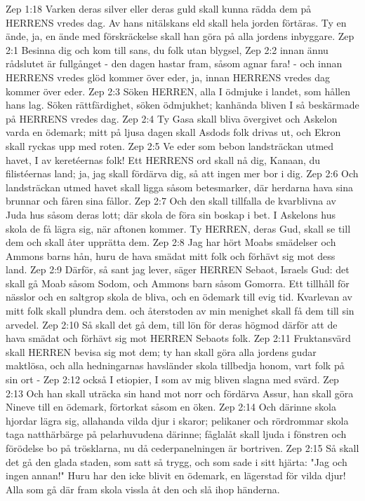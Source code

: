 Zep 1:18  Varken deras silver eller deras guld skall kunna rädda dem på HERRENS vredes dag. Av hans nitälskans eld skall hela jorden förtäras. Ty en ände, ja, en ände med förskräckelse skall han göra på alla jordens inbyggare.
Zep 2:1  Besinna dig och kom till sans, du folk utan blygsel,
Zep 2:2  innan ännu rådslutet är fullgånget - den dagen hastar fram, såsom agnar fara! - och innan HERRENS vredes glöd kommer över eder, ja, innan HERRENS vredes dag kommer över eder.
Zep 2:3  Söken HERREN, alla I ödmjuke i landet, som hållen hans lag. Söken rättfärdighet, söken ödmjukhet; kanhända bliven I så beskärmade på HERRENS vredes dag.
Zep 2:4  Ty Gasa skall bliva övergivet och Askelon varda en ödemark; mitt på ljusa dagen skall Asdods folk drivas ut, och Ekron skall ryckas upp med roten.
Zep 2:5  Ve eder som bebon landsträckan utmed havet, I av keretéernas folk! Ett HERRENS ord skall nå dig, Kanaan, du filistéernas land; ja, jag skall fördärva dig, så att ingen mer bor i dig.
Zep 2:6  Och landsträckan utmed havet skall ligga såsom betesmarker, där herdarna hava sina brunnar och fåren sina fållor.
Zep 2:7  Och den skall tillfalla de kvarblivna av Juda hus såsom deras lott; där skola de föra sin boskap i bet. I Askelons hus skola de få lägra sig, när aftonen kommer. Ty HERREN, deras Gud, skall se till dem och skall åter upprätta dem.
Zep 2:8  Jag har hört Moabs smädelser och Ammons barns hån, huru de hava smädat mitt folk och förhävt sig mot dess land.
Zep 2:9  Därför, så sant jag lever, säger HERREN Sebaot, Israels Gud: det skall gå Moab såsom Sodom, och Ammons barn såsom Gomorra. Ett tillhåll för nässlor och en saltgrop skola de bliva, och en ödemark till evig tid. Kvarlevan av mitt folk skall plundra dem. och återstoden av min menighet skall få dem till sin arvedel.
Zep 2:10  Så skall det gå dem, till lön för deras högmod därför att de hava smädat och förhävt sig mot HERREN Sebaots folk.
Zep 2:11  Fruktansvärd skall HERREN bevisa sig mot dem; ty han skall göra alla jordens gudar maktlösa, och alla hedningarnas havsländer skola tillbedja honom, vart folk på sin ort -
Zep 2:12  också I etiopier, I som av mig bliven slagna med svärd.
Zep 2:13  Och han skall uträcka sin hand mot norr och fördärva Assur, han skall göra Nineve till en ödemark, förtorkat såsom en öken.
Zep 2:14  Och därinne skola hjordar lägra sig, allahanda vilda djur i skaror; pelikaner och rördrommar skola taga natthärbärge på pelarhuvudena därinne; fåglalåt skall ljuda i fönstren och förödelse bo på trösklarna, nu då cederpanelningen är bortriven.
Zep 2:15  Så skall det gå den glada staden, som satt så trygg, och som sade i sitt hjärta: "Jag och ingen annan!" Huru har den icke blivit en ödemark, en lägerstad för vilda djur! Alla som gå där fram skola vissla åt den och slå ihop händerna.
